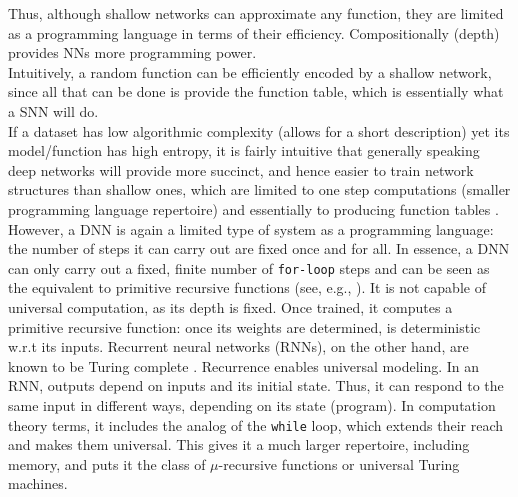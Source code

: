 \documentclass[11pt]{amsart}
\begin{document}
Thus, although shallow networks can approximate any function, they are limited  as a programming language in terms of their efficiency. Compositionally (depth) provides NNs more programming power.  \\

Intuitively, a random function can be efficiently encoded by a shallow network, since all that can be done is provide the function table, which is essentially what a SNN will do. \\


If a dataset has low algorithmic complexity (allows for a short description) yet its model/function has high entropy, it is fairly intuitive that generally speaking deep networks will provide more succinct, and hence easier to train network structures than shallow ones, which are limited to one step computations (smaller programming language repertoire) and essentially to producing function tables \cite{Poggio:2016aa}. \\

However, a DNN is again a limited type of system as a programming language: the number of steps it can carry out are fixed once and for all. In essence, a DNN can only carry out a fixed, finite number of {\tt for-loop} steps and can be seen as the equivalent to primitive recursive functions (see, e.g., \cite{Wolfram:2002aa}).  It is not capable of universal computation, as its depth is fixed. Once trained, it computes a primitive recursive function: once its weights are determined, is deterministic w.r.t its inputs.  Recurrent neural networks (RNNs), on the other hand, are known to be Turing complete \cite{Siegelmann:1995aa,Goodfellow:2016aa}. Recurrence  enables universal modeling.  In an RNN, outputs depend on inputs and its initial state. Thus, it can respond to the same input in different ways, depending on its state (program).  In computation theory terms, it includes the analog of the  {\tt while} loop, which extends their reach and makes them universal. This gives it a much larger repertoire, including memory, and puts it the class of $\mu$-recursive functions or universal Turing machines. %
\\
\end{document}

